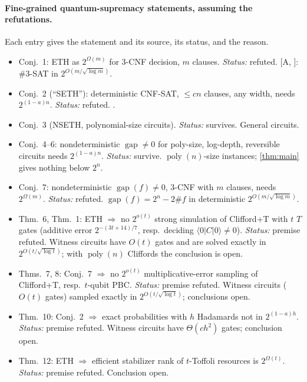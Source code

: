 \documentclass[10pt]{amsart}
\theoremstyle{plain}
\theoremstyle{definition}
\theoremstyle{remark}
\numberwithin{equation}{section}
\newcommand{\poly}{\operatorname{poly}}
\newcommand{\gap}{\operatorname{gap}}
\newcommand{\amp}[3]{\langle #1|#2|#3\rangle}
\newcommand{\A}[1][]{\textup{[A\if\relax\detokenize{#1}\relax\else, #1\fi]}}
\begin{document}
\paragraph{Fine-grained quantum-supremacy statements, assuming the refutations.}
Each entry gives the statement and its source, its status, and the reason.
{\small
\begin{itemize}[leftmargin=2.2em,itemsep=2pt]
\item[1.] \cite{MT19a} Conj.~1: ETH as $2^{\Omega(m)}$ for $3$-CNF decision, $m$ clauses. \emph{Status:} refuted. \A: $\#3$-SAT in $2^{O(m/\sqrt{\log m})}$.
\item[2.] \cite{MT19a} Conj.~2 (``SETH''): deterministic CNF-SAT, $\le cn$ clauses, any width, needs $2^{(1-a)n}$. \emph{Status:} refuted. .
\item[3.] \cite{MT19a} Conj.~3 (NSETH, polynomial-size circuits). \emph{Status:} survives. General circuits.
\item[4.] \cite{MT19a} Conj.~4--6: nondeterministic $\gap\ne0$ for poly-size, log-depth, reversible circuits needs $2^{(1-a)n}$. \emph{Status:} survive. $\poly(n)$-size instances; \cref{thm:main} gives nothing below $2^n$.
\item[5.] \cite{MT19a} Conj.~7: nondeterministic $\gap(f)\ne0$, $3$-CNF with $m$ clauses, needs $2^{\Omega(m)}$. \emph{Status:} refuted. $\gap(f)=2^n-2\#f$ in deterministic $2^{O(m/\sqrt{\log m})}$.
\item[6.] \cite{MT19a} Thm.~6, \cite{HNS19} Thm.~1: ETH $\Rightarrow$ no $2^{o(t)}$ strong simulation of Clifford+T with $t$ $T$ gates (additive error $2^{-(3t+14)/7}$, resp.\ deciding $\amp0C0\ne0$). \emph{Status:} premise refuted. Witness circuits have $O(t)$ gates and are solved exactly in $2^{O(t/\sqrt{\log t})}$; with $\poly(n)$ Cliffords the conclusion is open.
\item[7.] \cite{MT19a} Thms.~7, 8: Conj.~7 $\Rightarrow$ no $2^{o(t)}$ multiplicative-error sampling of Clifford+T, resp.\ $t$-qubit PBC. \emph{Status:} premise refuted. Witness circuits ($O(t)$ gates) sampled exactly in $2^{O(t/\sqrt{\log t})}$; conclusions open.
\item[8.] \cite{MT19a} Thm.~10: Conj.~2 $\Rightarrow$ exact probabilities with $h$ Hadamards not in $2^{(1-a)h}$. \emph{Status:} premise refuted. Witness circuits have $\Theta(ch^2)$ gates; conclusion open.
\item[9.] \cite{MT19a} Thm.~12: ETH $\Rightarrow$ efficient stabilizer rank of $t$-Toffoli resources is $2^{\Omega(t)}$. \emph{Status:} premise refuted. Conclusion open.

\end{itemize}}
\end{document}
